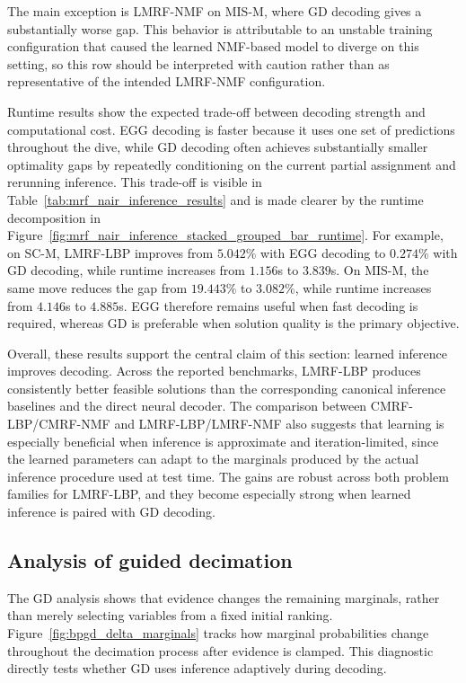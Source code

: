 The main exception is LMRF-NMF on MIS-M, where GD decoding gives a substantially worse gap. This behavior is attributable to an unstable training configuration that caused the learned NMF-based model to diverge on this setting, so this row should be interpreted with caution rather than as representative of the intended LMRF-NMF configuration.

Runtime results show the expected trade-off between decoding strength and computational cost. EGG decoding is faster because it uses one set of predictions throughout the dive, while GD decoding often achieves substantially smaller optimality gaps by repeatedly conditioning on the current partial assignment and rerunning inference. This trade-off is visible in Table~\ref{tab:mrf_nair_inference_results} and is made clearer by the runtime decomposition in Figure~\ref{fig:mrf_nair_inference_stacked_grouped_bar_runtime}. For example, on SC-M, LMRF-LBP improves from $5.042\%$ with EGG decoding to $0.274\%$ with GD decoding, while runtime increases from $1.156$s to $3.839$s. On MIS-M, the same move reduces the gap from $19.443\%$ to $3.082\%$, while runtime increases from $4.146$s to $4.885$s. EGG therefore remains useful when fast decoding is required, whereas GD is preferable when solution quality is the primary objective.



Overall, these results support the central claim of this section: learned inference improves decoding. Across the reported benchmarks, LMRF-LBP produces consistently better feasible solutions than the corresponding canonical inference baselines and the direct neural decoder. The comparison between CMRF-LBP/CMRF-NMF and LMRF-LBP/LMRF-NMF also suggests that learning is especially beneficial when inference is approximate and iteration-limited, since the learned parameters can adapt to the marginals produced by the actual inference procedure used at test time. The gains are robust across both problem families for LMRF-LBP, and they become especially strong when learned inference is paired with GD decoding.

\subsection{Analysis of guided decimation}

The GD analysis shows that evidence changes the remaining marginals, rather than merely selecting variables from a fixed initial ranking. Figure~\ref{fig:bpgd_delta_marginals} tracks how marginal probabilities change throughout the decimation process after evidence is clamped. This diagnostic directly tests whether GD uses inference adaptively during decoding.


